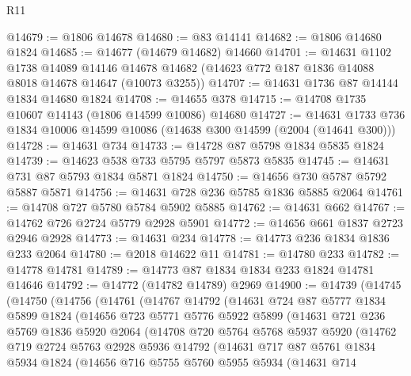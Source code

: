 \begin{lexlean}{R11}
\begin{coremodule}
@14679 := @1806 @14678
@14680 := @83 @14141
@14682 := @1806 @14680 @1824
@14685 := @14677 (@14679 @14682) @14660
@14701 := @14631
    @1102
    @1738
    @14089
    @14146
    @14678
    @14682
    (@14623 @772 @187 @1836 @14088 @8018 @14678 @14647 (@10073 @3255))
@14707 := @14631 @1736 @87 @14144 @1834 @14680 @1824
@14708 := @14655 @378
@14715 := @14708 @1735 @10607 @14143 (@1806 @14599 @10086) @14680
@14727 := @14631 @1733 @736 @1834 @10006 @14599 @10086 (@14638 @300 @14599 (@2004 (@14641 @300)))
@14728 := @14631 @734
@14733 := @14728 @87 @5798 @1834 @5835 @1824
@14739 := @14623 @538 @733 @5795 @5797 @5873 @5835
@14745 := @14631 @731 @87 @5793 @1834 @5871 @1824
@14750 := @14656 @730 @5787 @5792 @5887 @5871
@14756 := @14631 @728 @236 @5785 @1836 @5885 @2064
@14761 := @14708 @727 @5780 @5784 @5902 @5885
@14762 := @14631 @662
@14767 := @14762 @726 @2724 @5779 @2928 @5901
@14772 := @14656 @661 @1837 @2723 @2946 @2928
@14773 := @14631 @234
@14778 := @14773 @236 @1834 @1836 @233 @2064
@14780 := @2018 @14622 @11
@14781 := @14780 @233
@14782 := @14778 @14781
@14789 := @14773 @87 @1834 @1834 @233 @1824 @14781 @14646
@14792 := @14772 (@14782 @14789) @2969
@14900 := @14739
    (@14745
      (@14750
        (@14756
          (@14761
            (@14767
              @14792
              (@14631
                @724
                @87
                @5777
                @1834
                @5899
                @1824
                (@14656
                  @723
                  @5771
                  @5776
                  @5922
                  @5899
                  (@14631
                    @721
                    @236
                    @5769
                    @1836
                    @5920
                    @2064
                    (@14708
                      @720
                      @5764
                      @5768
                      @5937
                      @5920
                      (@14762
                        @719
                        @2724
                        @5763
                        @2928
                        @5936
                        @14792
                        (@14631
                          @717
                          @87
                          @5761
                          @1834
                          @5934
                          @1824
                          (@14656
                            @716
                            @5755
                            @5760
                            @5955
                            @5934
                            (@14631
                              @714

\end{coremodule}
\end{lexlean}
